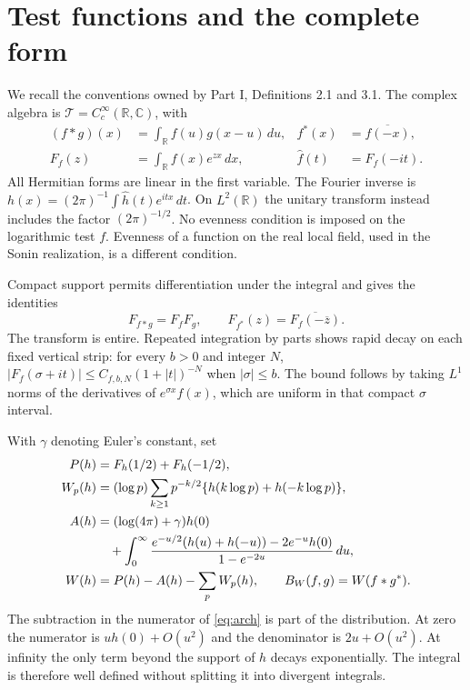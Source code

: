 \documentclass[11pt,letterpaper]{article}
\theoremstyle{definition}
\theoremstyle{remark}
\newcommand{\R}{\mathbb R}
\newcommand{\C}{\mathbb C}
\newcommand{\T}{\mathcal T}
\begin{document}
\section{Test functions and the complete form}

We recall the conventions owned by Part I, Definitions 2.1 and 3.1.
The complex algebra is $\T=C_c^\infty(\R,\C)$, with
\begin{align}
 (f*g)(x)&=\int_\R f(u)g(x-u)\,du,
 &f^*(x)&=\overline{f(-x)},\label{eq:tests}\\
 F_f(z)&=\int_\R f(x)e^{zx}\,dx,
 &\widehat f(t)&=F_f(-it).\label{eq:transforms}
\end{align}
All Hermitian forms are linear in the first variable. The Fourier
inverse is $h(x)=(2\pi)^{-1}\int\widehat h(t)e^{itx}\,dt$.
On $L^2(\R)$ the unitary transform instead includes the factor
$(2\pi)^{-1/2}$. No evenness condition is imposed on the logarithmic
test $f$. Evenness of a function on the real local field, used in the
Sonin realization, is a different condition.

Compact support permits differentiation under the integral and gives
the identities
\begin{equation}
 F_{f*g}=F_fF_g,\qquad
 F_{f^*}(z)=\overline{F_f(-\overline z)}.
 \label{eq:transform-identities}
\end{equation}
The transform is entire. Repeated integration by parts shows rapid
decay on each fixed vertical strip: for every $b>0$ and integer $N$,
$|F_f(\sigma+it)|\le C_{f,b,N}(1+|t|)^{-N}$ when $|\sigma|\le b$.
The bound follows by taking $L^1$ norms of the derivatives of
$e^{\sigma x}f(x)$, which are uniform in that compact $\sigma$ interval.

With $\gamma$ denoting Euler's constant, set
\begin{align}
 P(h)&=F_h(1/2)+F_h(-1/2),\label{eq:poles}\\
 W_p(h)&=(\log p)\sum_{k\ge1}p^{-k/2}
       \{h(k\log p)+h(-k\log p)\},\label{eq:Wp}\\
 A(h)&=(\log(4\pi)+\gamma)h(0)\notag\\
 &\quad+\int_0^\infty
 \frac{e^{-u/2}(h(u)+h(-u))-2e^{-u}h(0)}{1-e^{-2u}}\,du,
 \label{eq:arch}\\
 W(h)&=P(h)-A(h)-\sum_p W_p(h),\qquad
 B_W(f,g)=W(f*g^*).\label{eq:Weil}
\end{align}
The subtraction in the numerator of \eqref{eq:arch} is part of the
distribution. At zero the numerator is $u h(0)+O(u^2)$ and the
denominator is $2u+O(u^2)$. At infinity the only term beyond the
support of $h$ decays exponentially. The integral is therefore
well defined without splitting it into divergent integrals.
\end{document}
